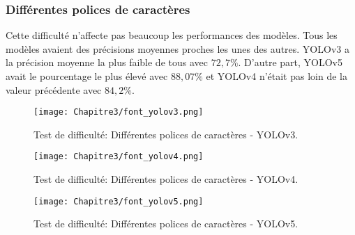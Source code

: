           \subsubsection{Différentes polices de caractères}
          Cette difficulté n'affecte pas beaucoup les performances des modèles. Tous les modèles avaient des précisions moyennes proches les unes des autres. YOLOv3 a la précision moyenne la plus faible de tous avec $72,7\%$. D'autre part, YOLOv5 avait le pourcentage le plus élevé avec $88,07\%$ et YOLOv4 n'était pas loin de la valeur précédente avec $84,2\%$.
          \begin{figure}[H]
                   \centering
                    \texttt{[image: Chapitre3/font\_yolov3.png]}
                    \caption{Test de difficulté: Différentes polices de caractères - YOLOv3.}
                    \label{y3_t1}
                    \end{figure}
          \begin{figure}[H]
                    \centering
                    \texttt{[image: Chapitre3/font\_yolov4.png]}
                    \caption{Test de difficulté: Différentes polices de caractères - YOLOv4.}
                    \label{y4_t2}
                    \end{figure}
          \begin{figure}[H]
                    \centering
                    \texttt{[image: Chapitre3/font\_yolov5.png]}
                    \caption{Test de difficulté: Différentes polices de caractères - YOLOv5.}
                    \label{y5_t2}
                    \end{figure}

